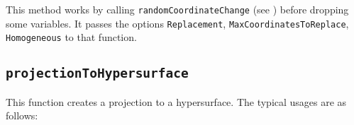 \documentclass[11pt]{amsart}
\theoremstyle{definition}
\begin{document}
\begin{comment}~~
  
  {{\small\color{blue}
\begin{verbatim}

i1 : R = ZZ/5[x, y, z, w];

i2 : I = ideal(x, y^2, w^3 + x^2);

i3 : genericProjection(2, R/I)	

                            ZZ                          ZZ
                            --[z, w]                    --[z, w]                        
                R           5                           5
o3 = (map(----------------,--------,{2y - w, - y - z}), --------)                       
             2   3    2        4                            4
        (x, y , w  + x )      z                            z

o3 : Sequence
\end{verbatim}}
    }}
\end{comment}


This method works by calling {\tt randomCoordinateChange} (see ) before dropping some variables.  It passes the options {\tt Replacement}, {\tt MaxCoordinatesToReplace}, {\tt Homogeneous} to that function.
\begin{comment}~~
  
  ~~
  
  {{\small\color{blue}
\begin{verbatim}
		
i2 : R = ZZ/5[x, y, z, w];

i3 : I = ideal(x, y^2, w^3 + x^2);

o3 : Ideal of R

i4 :genericProjection(2, I, Replacement => Binomial)

            ZZ                                   4
o4 = (map(R,--[z, w],{x + 2z, - 2y + w}), ideal w )                                     
            5

o4 : Sequence
\end{verbatim}}
    }}
\end{comment}

\subsection{\tt projectionToHypersurface} This function creates a projection to a hypersurface. The typical usages are as follows: 
\end{document}
